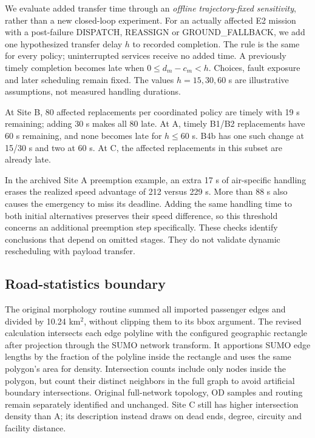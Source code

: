 \documentclass[11pt,a4paper]{article}
\begin{document}
We evaluate added transfer time through an \emph{offline trajectory-fixed sensitivity}, rather than a new closed-loop experiment. For an actually affected E2 mission with a post-failure DISPATCH, REASSIGN or GROUND\_FALLBACK, we add one hypothesized transfer delay $h$ to recorded completion. The rule is the same for every policy; uninterrupted services receive no added time. A previously timely completion becomes late when $0\le d_m-c_m<h$. Choices, fault exposure and later scheduling remain fixed. The values $h=15,30,60$ s are illustrative assumptions, not measured handling durations.

\begingroup
\setlength{\intextsep}{6pt}
\setlength{\belowcaptionskip}{3pt}

\endgroup

At Site B, 80 affected replacements per coordinated policy are timely with 19 s remaining; adding 30 s makes all 80 late. At A, timely B1/B2 replacements have 60 s remaining, and none becomes late for $h\le60$ s. B4b has one such change at 15/30 s and two at 60 s. At C, the affected replacements in this subset are already late.

In the archived Site A preemption example, an extra 17 s of air-specific handling erases the realized speed advantage of 212 versus 229 s. More than 88 s also causes the emergency to miss its deadline. Adding the same handling time to both initial alternatives preserves their speed difference, so this threshold concerns an additional preemption step specifically. These checks identify conclusions that depend on omitted stages. They do not validate dynamic rescheduling with payload transfer.

\subsection{Road-statistics boundary}

The original morphology routine summed all imported passenger edges and divided by 10.24 km$^2$, without clipping them to its bbox argument. The revised calculation intersects each edge polyline with the configured geographic rectangle after projection through the SUMO network transform. It apportions SUMO edge lengths by the fraction of the polyline inside the rectangle and uses the same polygon's area for density. Intersection counts include only nodes inside the polygon, but count their distinct neighbors in the full graph to avoid artificial boundary intersections. Original full-network topology, OD samples and routing remain separately identified and unchanged. Site C still has higher intersection density than A; its description instead draws on dead ends, degree, circuity and facility distance.
\end{document}

